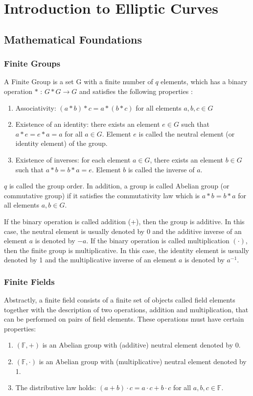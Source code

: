 \chapter{Introduction to Elliptic Curves} \label{Ch:EllipticCurve}
\section[Mathematical Foundations]{Mathematical Foundations \cite{hankerson2006guide}} 
\subsection*{Finite Groups}
A Finite Group is a set G with a finite number of $q$ elements, which has a binary operation $*$ : $G * G \rightarrow G$ and satisfies the following properties \cite{hankerson2006guide}:
\begin{enumerate}
	\item Associativity: $(a*b)*c=a*(b*c)$ for all elements $a,b,c \in G$
	\item Existence of an identity: there exists an element $e \in G$ such that $a*e=e*a=a$ for all $a \in G$. Element $e$ is called the neutral element (or identity element) of the group.
	\item Existence of inverses: for each element $a \in G$, there exists an element $b \in G$ such that $a*b=b*a=e$. Element $b$ is called the inverse of $a$.
\end{enumerate}
$q$ is called the group order. In addition, a group is called Abelian group (or commutative group) if it satisfies the commutativity law which is $a*b=b*a$ for all elements $a,b \in G$. 

If the binary operation is called addition (+), then the group is additive. In this case, the neutral element is usually denoted by 0 and the additive inverse of an element $a$ is denoted by $-a$. If the binary operation is called multiplication $(\cdot)$, then the finite group is multiplicative. In this case, the identity element is usually denoted by 1 and the multiplicative inverse of an element $a$ is denoted by $a^{-1}$.

\subsection*{Finite Fields}
Abstractly, a finite field consists of a finite set of objects called field elements together with the description of two operations, addition and multiplication, that can be performed on pairs of field elements. These operations must have certain properties: \cite{hankerson2006guide}
\begin{enumerate}
	\item $(\mathbb{F},+)$ is an Abelian group with (additive) neutral element denoted by 0.
	\item $(\mathbb{F},\cdot)$ is an Abelian group with (multiplicative) neutral element denoted by 1.
	\item The distributive law holds: $(a+b) \cdot c = a \cdot c + b \cdot c$ for all $a,b,c \in \mathbb{F}$. 
\end{enumerate}

